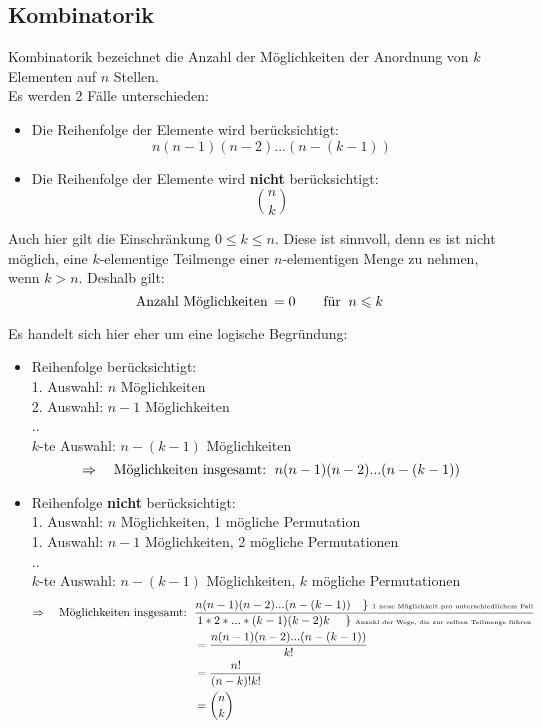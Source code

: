 \documentclass[main.tex]{subfiles}
\begin{document}
\subsection{Kombinatorik}
\begin{Theorem}
  Kombinatorik bezeichnet die Anzahl der Möglichkeiten der Anordnung von $k$ Elementen auf $n$ Stellen.\\
  Es werden 2 Fälle unterschieden:\\
  \begin{itemize}
    \item Die Reihenfolge der Elemente wird berücksichtigt:
          $$n(n-1)(n-2)...(n-(k-1))$$
    \item Die Reihenfolge der Elemente wird \textbf{nicht} berücksichtigt:
          $${n\choose k}$$
  \end{itemize}
\end{Theorem}
\begin{Bemerkung}
  Auch hier gilt die Einschränkung $0 \leq k \leq n$. Diese ist sinnvoll, denn es ist nicht möglich, eine $k$-elementige Teilmenge einer $n$-elementigen Menge zu nehmen, wenn $k > n$. Deshalb gilt:
  $$\text{Anzahl Möglichkeiten\,} = 0 \text{\qquad für \:} n \leq k $$
\end{Bemerkung}
\begin{Beweis}
  Es handelt sich hier eher um eine logische Begründung:\\
  \begin{itemize}
    \item Reihenfolge berücksichtigt:\\
    1. Auswahl: $n$ Möglichkeiten\\
    2. Auswahl: $n-1$ Möglichkeiten\\
    ..\\
    $k$-te Auswahl: $n-(k-1)$ Möglichkeiten\\
    $$\Rightarrow \text{\quad Möglichkeiten insgesamt:\, }  n(n-1)(n-2)...(n-(k-1))$$
    \item Reihenfolge \textbf{nicht} berücksichtigt:\\
    1. Auswahl: $n$ Möglichkeiten, 1 mögliche Permutation\\
    1. Auswahl: $n-1$ Möglichkeiten, 2 mögliche Permutationen\\
    ..\\
    $k$-te Auswahl: $n-(k-1)$ Möglichkeiten, $k$ mögliche Permutationen\\
    \begin{align*}
      \Rightarrow \text{\quad Möglichkeiten insgesamt:\, } & \dfrac{n(n-1)(n-2)...(n-(k-1))\text{\quad \} \tiny{1 neue Möglichkeit pro unterschiedlichem Fall}}}{1*2*...*(k-1)(k-2)k \text{ \quad \} \tiny{Anzahl der Wege, die zur selben Teilmenge führen}}}\\
      & = \dfrac{n(n-1)(n-2)...(n-(k-1))}{k!}\\
      & = \dfrac{n!}{(n-k)!k!}\\
      & = {n\choose k}
    \end{align*}
  \end{itemize}
\end{Beweis}
\end{document}
